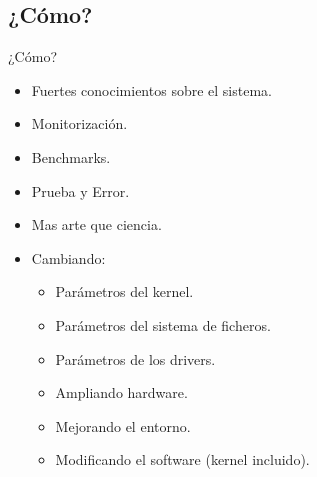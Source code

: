 \subsection{¿Cómo?}
\begin{frame}{¿Cómo?}
	\begin{itemize}
		\item Fuertes conocimientos sobre el sistema.
		\item Monitorización.
		\item Benchmarks.
		\item Prueba y Error.
		\item Mas arte que ciencia.
		\item Cambiando:
		\begin{itemize}
			\item Parámetros del kernel.
			\item Parámetros del sistema de ficheros.
			\item Parámetros de los drivers.
			\item Ampliando hardware.
			\item Mejorando el entorno.
			\item Modificando el software (kernel incluido).
		\end{itemize}
	\end{itemize}
\end{frame}
